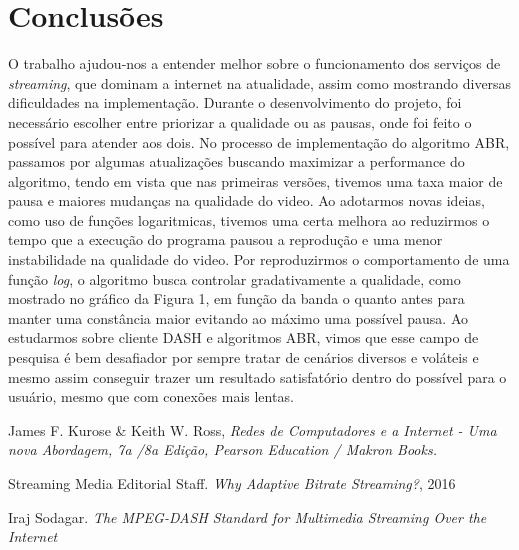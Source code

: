 \documentclass[12pt]{article}
\begin{document}
\section{Conclusões}
O trabalho ajudou-nos a entender melhor sobre o funcionamento dos serviços de \textit{streaming}, que dominam a internet na atualidade, assim como mostrando diversas dificuldades na implementação. Durante o desenvolvimento do projeto, foi necessário escolher entre priorizar a qualidade ou as pausas, onde foi feito o possível para atender aos dois. No processo de implementação do algoritmo ABR, passamos por algumas atualizações buscando maximizar a performance do algoritmo, tendo em vista que nas primeiras versões, tivemos uma taxa maior de pausa e maiores mudanças na qualidade do video. Ao adotarmos novas ideias, como uso de funções logaritmicas, tivemos uma certa melhora ao reduzirmos o tempo que a execução do programa pausou a reprodução e uma menor instabilidade na qualidade do video. Por reproduzirmos o comportamento de uma função \textit{log}, o algoritmo busca controlar gradativamente a qualidade, como mostrado no gráfico da Figura 1, em função da banda o quanto antes para manter uma constância maior evitando ao máximo uma possível pausa. Ao estudarmos sobre cliente DASH e algoritmos ABR, vimos que esse campo de pesquisa é bem desafiador por sempre tratar de cenários diversos e voláteis e mesmo assim conseguir trazer um resultado satisfatório dentro do possível para o usuário, mesmo que com conexões mais lentas.

\begin{thebibliography}{9}

\noindent James F. Kurose \& Keith W. Ross, 
\textit{Redes de Computadores e a Internet - Uma nova Abordagem, 7a /8a Edição, Pearson Education / Makron Books.}

\noindent Streaming Media Editorial Staff.
\textit{Why Adaptive Bitrate Streaming?}, 2016

\noindent Iraj Sodagar.
\textit{The MPEG-DASH Standard for Multimedia Streaming Over the Internet}

\end{thebibliography}
\end{document}
